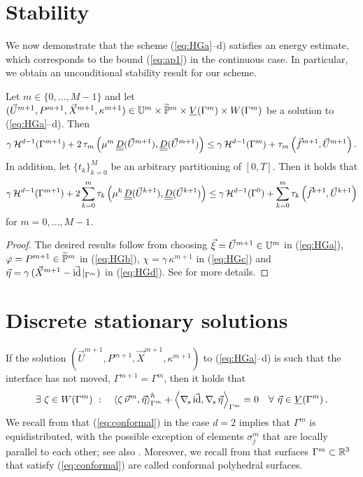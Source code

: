 \section{Stability}\label{sec:stokes_stability}
We now demonstrate that the scheme (\ref{eq:HGa}--d) satisfies an energy
estimate, which corresponds to the bound (\ref{eq:ap1}) in the continuous case.
In particular, we obtain an unconditional stability result for our scheme.

\begin{theorem} \label{thm:stabstab}
Let $m \in \{0,\ldots,M-1\}$ and let
$(\vec U^{m+1},P^{m+1},\vec{X}^{m+1}, \kappa^{m+1}) \in \mathbb{U}^m\times
\widetilde{\mathbb{P}}^m \times \underline{V}(\Gamma^m) \times W(\Gamma^m)$ be a solution to (\ref{eq:HGa}--d). Then
\begin{equation}\label{eq:stab}
\gamma\, \surfvol(\Gamma^{m+1})
+ 2\,\tau_m\left(\mu^m\,\mat D(\vec U^{m+1}), \mat D(\vec U^{m+1}) \right) \leq
\gamma\,\surfvol(\Gamma^m) + \tau_m\left( \vec f^{m+1}, \vec U^{m+1}
\right).
\end{equation}
In addition, let $\{t_k\}_{k=0}^M$ be an arbitrary partitioning of $[0,T]$.
Then it holds that
\begin{equation}\label{eq:stabstab}
\gamma\,\surfvol(\Gamma^{m+1})
+ 2 \sum_{k=0}^m  \tau_k\left(\mu^k\,\mat D(\vec U^{k+1}), \mat D(\vec U^{k+1})
\right)\leq \gamma\,\surfvol(\Gamma^0) + \sum_{k=0}^m \tau_k\left(\vec
f^{k+1}, \vec U^{k+1} \right)
\end{equation}
for $m=0,\ldots, M-1$.
\end{theorem}
\begin{proof}
The desired results follow from choosing $\vec\xi = \vec U^{m+1} \in \mathbb{U}^m$
in (\ref{eq:HGa}),
$\varphi = P^{m+1} \in \widetilde{\mathbb{P}}^m$ in (\ref{eq:HGb}),
$\chi = \gamma\,\kappa^{m+1}$ in (\ref{eq:HGc}) and
$\vec\eta=\gamma\,({\vec{X}^{m+1}-\vec{\rm id}\!\mid_{\Gamma^m}})$ in
(\ref{eq:HGd}). See \cite[Proof of Theorem~2]{spurious} for more details.
\end{proof}

\section{Discrete stationary solutions}\label{sec:stokes_stationary_solution}
If the solution $(\vec U^{m+1},P^{m+1},\vec X^{m+1}, \kappa^{m+1})$ to
(\ref{eq:HGa}--d) is such that the interface has not moved,
$\Gamma^{m+1} = \Gamma^m$, then it holds that
\begin{equation}\label{eq:conformal}
\exists\ \zeta \in W(\Gamma^m) \ : \quad \left\langle \zeta\,\vec\nu^{m}, \vec\eta
\right\rangle_{\Gamma^{m}}^h + \left\langle \nabla_{\!s}\,\vec {\rm id}, \nabla_{\!s}\,\vec \eta
\right\rangle_{\Gamma^{m}} = 0 \quad \forall\ \vec\eta \in \underline{V}(\Gamma^m) \,.
\end{equation}
We recall from \cite[Remark~2.4]{triplej} that (\ref{eq:conformal}) in the
case $d=2$ implies that $\Gamma^m$ is equidistributed, with the possible
exception of
elements $\sigma^m_j$ that are locally parallel to each other; see also
\cite[Theorem~2.2]{fdfi}.
Moreover, we recall from \cite[\S4.1]{gflows3d}
that surfaces $\Gamma^m \subset {\mathbb R}^3$
that satisfy (\ref{eq:conformal}) are called conformal polyhedral surfaces.

